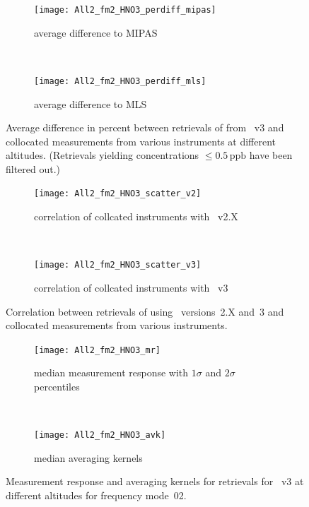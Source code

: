 \begin{figure}[tbhp]
    \centering
    \begin{subfigure}[b]{0.49\textwidth}
        \texttt{[image: All2\_fm2\_HNO3\_perdiff\_mipas]}
        \caption{average difference to MIPAS}
        \label{fig:fm02:HNO3:profiles:MIPAS}
    \end{subfigure}
    \,
    \begin{subfigure}[b]{0.49\textwidth}
        \texttt{[image: All2\_fm2\_HNO3\_perdiff\_mls]}
        \caption{average difference to MLS}
        \label{fig:fm02:HNO3:profiles:MLS}
    \end{subfigure}
    \caption{Average difference in percent between retrievals of 
    from \smr~v3 and collocated measurements from various instruments at
    different altitudes. (Retrievals yielding concentrations
    $\leq 0.5\,\mathrm{ppb}$ have been filtered out.)}

    \label{fig:fm02:HNO3:profiles}
\end{figure}

\begin{figure}[tbhp]
    \centering
    \begin{subfigure}[b]{0.49\textwidth}
        \texttt{[image: All2\_fm2\_HNO3\_scatter\_v2]}
        \caption{correlation of collcated instruments with \smr~v2.X}
        \label{fig:fm02:HNO3:scatter:v2}
    \end{subfigure}
    \,
    \begin{subfigure}[b]{0.49\textwidth}
        \texttt{[image: All2\_fm2\_HNO3\_scatter\_v3]}
        \caption{correlation of collcated instruments with \smr~v3}
        \label{fig:fm02:HNO3:scatter:v3}
    \end{subfigure}
    \caption{Correlation between retrievals of  using \smr\
    versions~2.X and~3 and collocated measurements from various instruments.}
    \label{fig:fm02:HNO3:scatter}
\end{figure}

\begin{figure}[tbhp]
    \centering
    \begin{subfigure}[b]{0.49\textwidth}
        \texttt{[image: All2\_fm2\_HNO3\_mr]}
        \caption{median measurement response with $1\sigma$ and $2\sigma$
        percentiles}
        \label{fig:fm02:HNO3:mr}
    \end{subfigure}
    \,
    \begin{subfigure}[b]{0.49\textwidth}
        \texttt{[image: All2\_fm2\_HNO3\_avk]}
        \caption{median averaging kernels\newline~}
        \label{fig:fm02:HNO3:avk}
    \end{subfigure}
    \caption{Measurement response and averaging kernels for 
    retrievals for \smr~v3 at different altitudes for frequency mode~02.}
    \label{fig:fm02:HNO3:mr_avk}
\end{figure}


